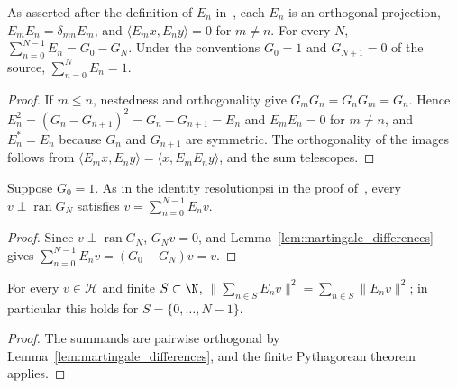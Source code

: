 \begin{lemma}
    \label{lem:martingale_differences}
    \leanok
    As asserted after the definition of $E_n$ in~\cite{Nachtergaele1996Spectral}, each
    $E_n$ is an orthogonal projection, $E_mE_n=\delta_{mn}E_m$, and
    $\langle E_mx,E_ny\rangle=0$ for $m\neq n$. For every $N$,
    $\sum_{n=0}^{N-1}E_n=G_0-G_N$. Under the conventions $G_0=1$ and $G_{N+1}=0$ of the
    source, $\sum_{n=0}^{N}E_n=1$.
\end{lemma}
\begin{proof}\leanok
    If $m\le n$, nestedness and orthogonality give $G_mG_n=G_nG_m=G_n$. Hence
    $E_n^2=(G_n-G_{n+1})^2=G_n-G_{n+1}=E_n$ and $E_mE_n=0$ for $m\neq n$, and
    $E_n^*=E_n$ because $G_n$ and $G_{n+1}$ are symmetric. The orthogonality of the
    images follows from $\langle E_mx,E_ny\rangle=\langle x,E_mE_ny\rangle$, and the
    sum telescopes.
\end{proof}

\begin{lemma}
    \label{lem:martingale_reconstruction}
    \leanok
    Suppose $G_0=1$. As in the identity \textup{resolutionpsi} in the proof
    of~\cite[Theorem~2.1(i)]{Nachtergaele1996Spectral}, every
    $v\perp\operatorname{ran}G_N$ satisfies $v=\sum_{n=0}^{N-1}E_nv$.
\end{lemma}
\begin{proof}\leanok
    Since $v\perp\operatorname{ran}G_N$, $G_Nv=0$, and
    Lemma~\ref{lem:martingale_differences} gives $\sum_{n=0}^{N-1}E_nv=(G_0-G_N)v=v$.
\end{proof}

\begin{lemma}
    \label{lem:martingale_pythagorean}
    \leanok
    For every $v\in\mathcal H$ and finite $S\subset\N$,
    $\bigl\lVert\sum_{n\in S}E_nv\bigr\rVert^2=\sum_{n\in S}\lVert E_nv\rVert^2$; in
    particular this holds for $S=\{0,\dots,N-1\}$.
\end{lemma}
\begin{proof}\leanok
    The summands are pairwise orthogonal by Lemma~\ref{lem:martingale_differences},
    and the finite Pythagorean theorem applies.
\end{proof}

